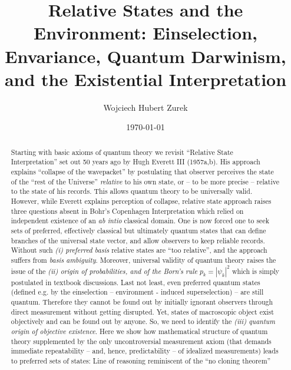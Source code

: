 \documentclass[aps,twocolumn,rmp,epsfig]{revtex4}
\newcommand{\+}         {\dagger}
\begin{document}
\title{Relative States and the Environment: Einselection, Envariance, Quantum Darwinism, and the Existential Interpretation}

\author{Wojciech Hubert Zurek}

\address{Theory Division, MS B213, LANL
    Los Alamos, NM, 87545, U.S.A.}

\date{\today}

\begin{abstract}
Starting with basic axioms of quantum theory we revisit  ``Relative State Interpretation'' set out 50 years ago by Hugh Everett III (1957a,b). His approach explains ``collapse of the wavepacket'' by postulating 
that observer perceives the state of the ``rest of the Universe'' {\it relative} to his own state, 
or -- to be more precise -- relative to the state of his records. This allows quantum theory to be universally valid. However, while Everett explains perception of collapse, relative state approach raises 
three questions absent in Bohr's Copenhagen Interpretation which relied on independent existence 
of an {\it ab intio} classical domain. One is now forced one to seek sets of preferred, effectively classical but ultimately quantum states that can define branches of the universal state vector, and allow observers to keep reliable records. Without such {\it (i) preferred basis} relative states are ``too relative'', and the approach suffers from {\it basis ambiguity}. Moreover, universal validity of quantum theory 
raises the issue of the {\it (ii) origin of probabilities, and of the Born's rule} $p_k = |\psi_k|^2$ which is simply postulated in textbook discussions. Last not least, even preferred quantum states (defined e.g. by the einselection -- environment - induced superselection) -- are still quantum. Therefore they cannot be found out by initially ignorant observers through direct measurement without getting disrupted. 
Yet, states of macroscopic object exist objectively and can be found out by anyone. So, we need to identify the {\it (iii) quantum origin of objective existence}. Here we show how mathematical structure of quantum theory supplemented by the only uncontroversial measurement axiom (that demands immediate repeatability -- and, hence, predictability -- of idealized measurements) 
leads to preferred sets of states: Line of reasoning reminiscent of the  ``no cloning theorem'' 

\end{abstract}
\end{document}
